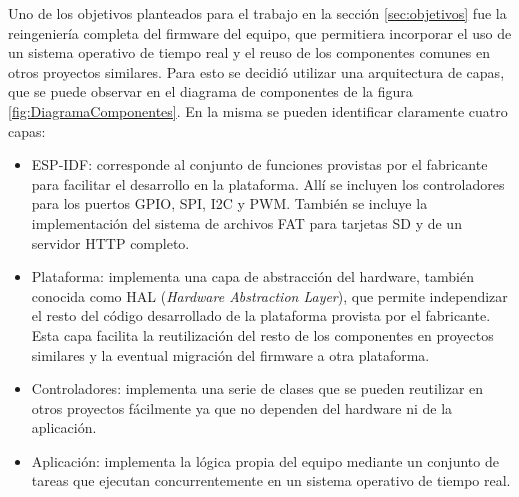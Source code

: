Uno de los objetivos planteados para el trabajo en la sección \ref{sec:objetivos} fue la reingeniería completa del firmware del equipo, que permitiera incorporar el uso de un sistema operativo de tiempo real y el reuso de los componentes comunes en otros proyectos similares. Para esto se decidió utilizar una arquitectura de capas, que se puede observar en el diagrama de componentes de la figura \ref{fig:DiagramaComponentes}. En la misma se pueden identificar claramente cuatro capas:

\begin{itemize}
	\item ESP-IDF: corresponde al conjunto de funciones provistas por el fabricante para facilitar el desarrollo en la plataforma. Allí se incluyen los controladores para los puertos GPIO, SPI, I2C y PWM. También se incluye la implementación del sistema de archivos FAT para tarjetas SD y de un servidor HTTP completo.

	\item Plataforma: implementa una capa de abstracción del hardware, también conocida como HAL (\emph{Hardware Abstraction Layer}), que permite independizar el resto del código desarrollado de la plataforma provista por el fabricante. Esta capa facilita la reutilización del resto de los componentes en proyectos similares y la eventual migración del firmware a otra plataforma.

	\item Controladores: implementa una serie de clases que se pueden reutilizar en otros proyectos fácilmente ya que no dependen del hardware ni de la aplicación.

	\item Aplicación: implementa la lógica propia del equipo mediante un conjunto de tareas que ejecutan concurrentemente en un sistema operativo de tiempo real.
\end{itemize}


